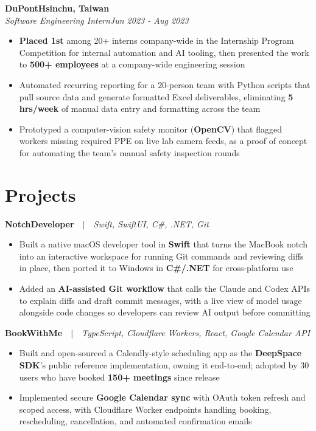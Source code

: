 \documentclass[letterpaper,11pt]{article}
\newcommand{\jobentry}[4]{%
  \textbf{#1}\hfill\textbf{#2}\\
  \textit{#3}\hfill\textit{#4}\par\vspace{1pt}}
\newcommand{\projectentry}[2]{\textbf{#1}\ \ $|$\ \ \textit{#2}\par\vspace{1pt}}
\newcommand{\entrygap}{\vspace{4pt}}
\begin{document}
\jobentry{DuPont}{Hsinchu, Taiwan}{Software Engineering Intern}{Jun 2023 - Aug 2023}
\begin{itemize}
  \item \textbf{Placed 1st} among 20+ interns company-wide in the Internship Program Competition for internal automation and AI tooling, then presented the work to \textbf{500+ employees} at a company-wide engineering session
  \item Automated recurring reporting for a 20-person team with Python scripts that pull source data and generate formatted Excel deliverables, eliminating \textbf{5 hrs/week} of manual data entry and formatting across the team
  \item Prototyped a computer-vision safety monitor (\textbf{OpenCV}) that flagged workers missing required PPE on live lab camera feeds, as a proof of concept for automating the team's manual safety inspection rounds
\end{itemize}

\section{Projects}

\projectentry{NotchDeveloper}{Swift, SwiftUI, C\#, .NET, Git}
\begin{itemize}
  \item Built a native macOS developer tool in \textbf{Swift} that turns the MacBook notch into an interactive workspace for running Git commands and reviewing diffs in place, then ported it to Windows in \textbf{C\#/.NET} for cross-platform use
  \item Added an \textbf{AI-assisted Git workflow} that calls the Claude and Codex APIs to explain diffs and draft commit messages, with a live view of model usage alongside code changes so developers can review AI output before committing
\end{itemize}
\entrygap

\projectentry{BookWithMe}{TypeScript, Cloudflare Workers, React, Google Calendar API}
\begin{itemize}
  \item Built and open-sourced a Calendly-style scheduling app as the \textbf{DeepSpace SDK}'s public reference implementation, owning it end-to-end; adopted by 30 users who have booked \textbf{150+ meetings} since release
  \item Implemented secure \textbf{Google Calendar sync} with OAuth token refresh and scoped access, with Cloudflare Worker endpoints handling booking, rescheduling, cancellation, and automated confirmation emails
\end{itemize}
\end{document}
